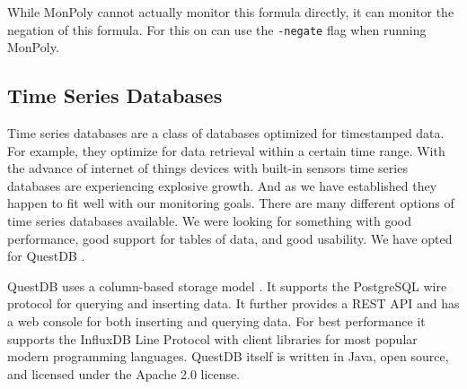 While MonPoly cannot actually monitor this formula directly, it can monitor the negation of this formula.
For this on can use the \texttt{-negate} flag when running MonPoly.

\subsection{Time Series Databases}

Time series databases are a class of databases optimized for timestamped data.
For example, they optimize for data retrieval within a certain time range.
With the advance of internet of things devices with built-in sensors time series databases are experiencing explosive growth.
And as we have established they happen to fit well with our monitoring goals.
There are many different options of time series databases available.
We were looking for something with good performance, good support for tables of data, and good usability.
We have opted for QuestDB \cite{questdb}.

QuestDB uses a column-based storage model \cite{questdb-storage-model}.
It supports the PostgreSQL wire protocol \cite{questdb-postgres-wire} for querying and inserting data.
It further provides a REST API and has a web console for both inserting and querying data.
For best performance it supports the InfluxDB Line Protocol \cite{questdb-influx-db-line-protocol} with client libraries for most popular modern programming languages.
QuestDB itself is written in Java, open source, and licensed under the Apache 2.0 license.
 


